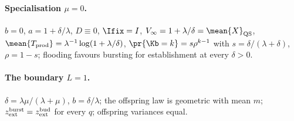 \paragraph{Specialisation $\mu=0$.} $b=0$, $a=1+\delta/\lambda$, $D\equiv0$,
$\Ifix=I$, $V_\infty=1+\lambda/\delta=\mean{X}_{\rm QS}$,
$\mean{T_{\rm prod}}=\lambda^{-1}\log(1+\lambda/\delta)$,
$\pr{\Kb=k}=s\rho^{k-1}$ with $s=\delta/(\lambda+\delta)$, $\rho=1-s$;
flooding favours bursting for establishment at every $\delta>0$.

\paragraph{The boundary $L=1$.} $\delta=\lambda\mu/(\lambda+\mu)$,
$b=\delta/\lambda$; the offspring law is geometric with mean $m$;
$z_{\rm ext}^{\rm burst}=z_{\rm ext}^{\rm bud}$ for every $q$; offspring
variances equal.

\endgroup
